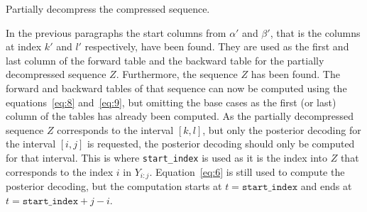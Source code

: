 \begin{algorithm}
  \caption{Partially decompress the compressed sequence.}
  \label{alg:decompress}
  \begin{algorithmic}[1]
                 
                    \EndIf{}
                \Else{}
                     
                \EndIf{}
                 
            \EndIf{}
             
        \EndWhile{}
    \EndProcedure{}
  \end{algorithmic}
\end{algorithm}

In the previous paragraphs the start columns from $\alpha'$ and $\beta'$, that
is the columns at index $k'$ and $l'$ respectively, have been found. They are
used as the first and last column of the forward table and the backward table for
the partially decompressed sequence $Z$. Furthermore, the sequence $Z$ has
been found. The forward and backward tables of that sequence can now be
computed using the equations~\eqref{eq:8} and~\eqref{eq:9}, but omitting
the base cases as the first (or last) column of the tables has already been
computed. As the partially decompressed sequence $Z$ corresponds to the
interval $[k, l]$, but only the posterior decoding for the interval $[i, j]$ is
requested, the posterior decoding should only be computed for that interval.
This is where \texttt{start\_index} is used as it is the index into $Z$
that corresponds to the index $i$ in $Y_{i:j}$. Equation~\eqref{eq:6}
is still used to compute the posterior decoding, but the computation starts at
$t = \mathtt{start\_index}$ and ends at $t = \mathtt{start\_index} + j - i$.

